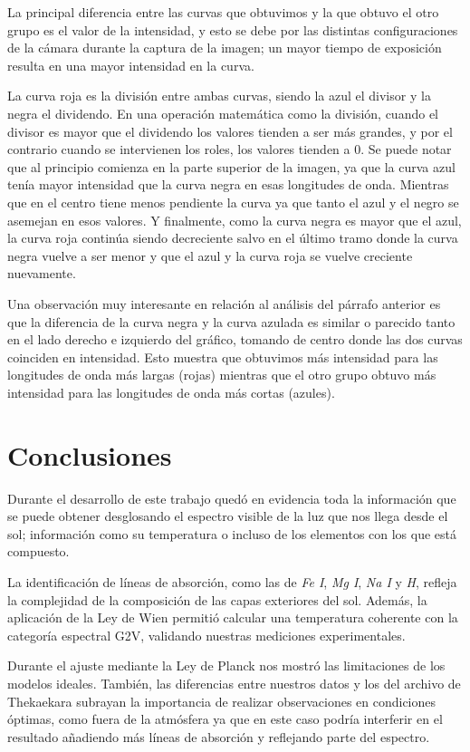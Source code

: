 \documentclass[11pt, a4paper]{article}
\begin{document}
La principal diferencia entre las curvas que obtuvimos y la que obtuvo el otro grupo es el valor de la intensidad, y esto se debe por las distintas configuraciones de la cámara durante la captura de la imagen; un mayor tiempo de exposición resulta en una mayor intensidad en la curva.

La curva roja es la división entre ambas curvas, siendo la azul el divisor  y la negra el dividendo. En una operación matemática como la división, cuando el divisor es mayor que el dividendo los valores tienden a ser más grandes, y por el contrario cuando se intervienen los roles, los valores tienden a 0. Se puede notar que al principio comienza en la parte superior de la imagen, ya que la curva azul tenía mayor intensidad que la curva negra en esas longitudes de onda. Mientras que en el centro tiene menos pendiente la curva ya que tanto el azul y el negro se asemejan en esos valores. Y finalmente, como la curva negra es mayor que el azul, la curva roja continúa siendo decreciente salvo en el último tramo donde la curva negra vuelve a ser menor y que el azul y la curva roja se vuelve creciente nuevamente. 

Una observación muy interesante en relación al análisis del párrafo anterior es que la diferencia de la curva negra y la curva azulada es similar o parecido tanto en el lado derecho e izquierdo del gráfico, tomando de centro donde las dos curvas coinciden en intensidad. Esto muestra que obtuvimos más intensidad para las longitudes de onda más largas (rojas) mientras que el otro grupo obtuvo más intensidad para las longitudes de onda más cortas (azules). 


\section{Conclusiones}
Durante el desarrollo de este trabajo quedó en evidencia toda la información que se puede obtener desglosando el espectro visible de la luz que nos llega desde el sol; información como su temperatura o incluso de los elementos con los que está compuesto.

La identificación de líneas de absorción, como las de \textit{Fe I}, \textit{Mg I}, \textit{Na I} y \textit{H}, refleja la complejidad de la composición de las capas exteriores del sol. Además, la aplicación de la Ley de Wien permitió calcular una temperatura coherente con la categoría espectral G2V, validando nuestras mediciones experimentales.

Durante el ajuste mediante la Ley de Planck nos mostró las limitaciones de los modelos ideales. También, las diferencias entre nuestros datos y los del archivo de Thekaekara subrayan la importancia de realizar observaciones en condiciones óptimas, como fuera de la atmósfera ya que en este caso podría interferir en el resultado añadiendo más líneas de absorción y reflejando parte del espectro.
\end{document}
